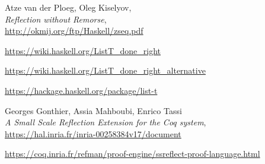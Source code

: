 \documentclass[declaration,inz,english,shortabstract]{iithesis}
\begin{document}
\begin{thebibliography}{1}
        Atze van der Ploeg, Oleg Kiselyov, \\
        \textit{Reflection without Remorse}, \\
        \url{http://okmij.org/ftp/Haskell/zseq.pdf}

        \url{https://wiki.haskell.org/ListT_done_right}

        \url{https://wiki.haskell.org/ListT_done_right_alternative}

        \url{https://hackage.haskell.org/package/list-t}

        Georges Gonthier, Assia Mahboubi, Enrico Tassi \\
        \textit{A Small Scale Reflection Extension for the Coq system}, \\
        \url{https://hal.inria.fr/inria-00258384v17/document}

        \url{https://coq.inria.fr/refman/proof-engine/ssreflect-proof-language.html}
\end{thebibliography}

\end{document}
